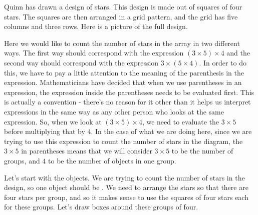 \documentclass{ximera}
\begin{document}
\begin{example}
Quinn has drawn a design of stars. This design is made out of squares of four stars. The squares are then arranged in a grid pattern, and the grid has five columns and three rows. Here is a picture of the full design.
\begin{image}
\end{image}

Here we would like to count the number of stars in the array in two different ways. The first way should correspond with the expression $(3 \times 5) \times 4$ and the second way should correspond with the expression $3 \times (5 \times 4)$. In order to do this, we have to pay a little attention to the meaning of the parenthesis in the expression. Mathematicians have decided that when we use parentheses in an expression, the expression inside the parentheses needs to be evaluated first. This is actually a convention - there's no reason for it other than it helps us interpret expressions in the same way as any other person who looks at the same expression. So, when we look at $(3 \times 5) \times 4$, we need to evaluate the $3 \times 5$ before multiplying that by $4$. In the case of what we are doing here, since we are trying to use this expression to count the number of stars in the diagram, the $3 \times 5$ in parentheses means that we will consider $3 \times 5$ to be the number of groups, and $4$ to be the number of objects in one group. 

Let's start with the objects. We are trying to count the number of stars in the design, so one object should be . We need to arrange the stars so that there are four stars per group, and so it makes sense to use the squares of four stars each for these groups. Let's draw boxes around these groups of four.
\begin{image}
\end{image}


\end{example}
\end{document}
